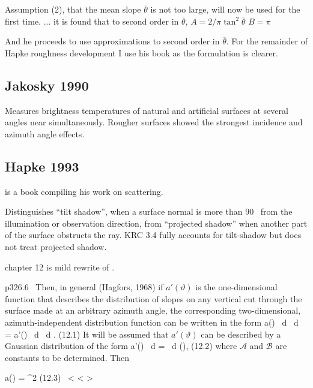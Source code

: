 \documentclass{article}
\newcommand{\eqq}{ \ < \! \! < \! > \ } %
\begin{document}
Assumption (2), that the mean slope $ \overline{\theta}$ is not too large, will
now be used for the first time.  ... it is found that to second order in $ \overline{\theta}$,  
\qi $A=2/\pi \tan^2 \overline{\theta} $
\qi $B=\pi$  \ \  \eq

 And he proceeds to use approximations to second order in
 $\overline{\theta}$. For the remainder of Hapke roughness development I use his
 book as the formulation is clearer.

\subsection{Jakosky 1990} %
 Measures brightness temperatures of natural and artificial
surfaces at several angles near simultaneously. Rougher surfaces showed the
strongest incidence and azimuth angle effects.

\subsection{Hapke 1993} %
   is a book compiling his work on scattering. 

Distinguishes ``tilt shadow'', when a surface normal is more than 90\qd~ from
the illumination or observation direction, from ``projected shadow'' when
another part of the surface obstructs the ray.  KRC 3.4 fully accounts for
tilt-shadow but does not treat projected shadow.

  chapter 12 is mild rewrite of .

p326.6 \ \bq Then, in general (Hagfors, 1968) if $a'(\vartheta)$ is the
one-dimensional function that describes the distribution of slopes on any
vertical cut through the surface made at an arbitrary azimuth angle, the
corresponding two-dimensional, azimuth-independent distribution function can be
written in the form 
\qb a(\vartheta) \ d \vartheta \ d \zeta 
= a'(\vartheta) \sin \vartheta \ d \vartheta \ d \zeta. \qeq (12.1) \qe
It will be assumed that $a'(\vartheta)$ can be described by a Gaussian
 distribution of the form
\qb a'(\vartheta ) \ d \vartheta  =  \exp {} \ d (\tan \vartheta), \qeq (12.2) \qe
 where $\mathcal{A}$ and $\mathcal{B}$ are constants to be determined. Then

\qb a(\vartheta ) = \exp {}
\sec^2 \vartheta  \sin \vartheta \qeq (12.3) \eqq \qe
\end{document}
